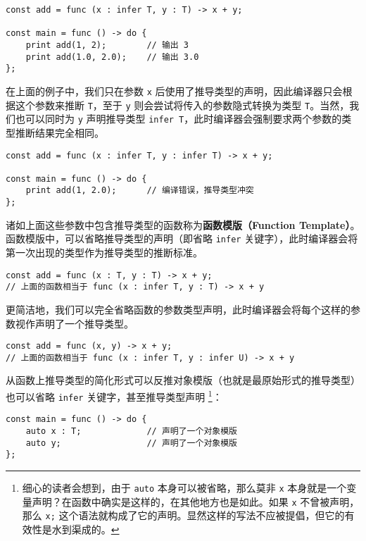 \begin{lstlisting}
const add = func (x : infer T, y : T) -> x + y;

const main = func () -> do {
	print add(1, 2);		// 输出 3
	print add(1.0, 2.0);	// 输出 3.0
};
\end{lstlisting}

在上面的例子中，我们只在参数 \lstinline!x! 后使用了推导类型的声明，因此编译器只会根据这个参数来推断 \lstinline!T!，至于 \lstinline!y! 则会尝试将传入的参数隐式转换为类型 \lstinline!T!。当然，我们也可以同时为 \lstinline!y! 声明推导类型 \lstinline!infer T!，此时编译器会强制要求两个参数的类型推断结果完全相同。

\begin{lstlisting}
const add = func (x : infer T, y : infer T) -> x + y;

const main = func () -> do {
	print add(1, 2.0);		// 编译错误，推导类型冲突
};
\end{lstlisting}

诸如上面这些参数中包含推导类型的函数称为\textbf{函数模版（Function Template）}。函数模版中，可以省略推导类型的声明（即省略 \lstinline!infer! 关键字），此时编译器会将第一次出现的类型作为推导类型的推断标准。

\begin{lstlisting}
const add = func (x : T, y : T) -> x + y;
// 上面的函数相当于 func (x : infer T, y : T) -> x + y
\end{lstlisting}

更简洁地，我们可以完全省略函数的参数类型声明，此时编译器会将每个这样的参数视作声明了一个推导类型。

\begin{lstlisting}
const add = func (x, y) -> x + y;
// 上面的函数相当于 func (x : infer T, y : infer U) -> x + y
\end{lstlisting}

从函数上推导类型的简化形式可以反推对象模版（也就是最原始形式的推导类型）也可以省略 \lstinline!infer! 关键字，甚至推导类型声明 \footnote{细心的读者会想到，由于 \lstinline!auto! 本身可以被省略，那么莫非 \lstinline!x! 本身就是一个变量声明？在函数中确实是这样的，在其他地方也是如此。如果 \lstinline!x! 不曾被声明，那么 \lstinline!x;! 这个语法就构成了它的声明。显然这样的写法不应被提倡，但它的有效性是水到渠成的。}：

\begin{lstlisting}
const main = func () -> do {
	auto x : T;				// 声明了一个对象模版
	auto y;					// 声明了一个对象模版
};
\end{lstlisting}

